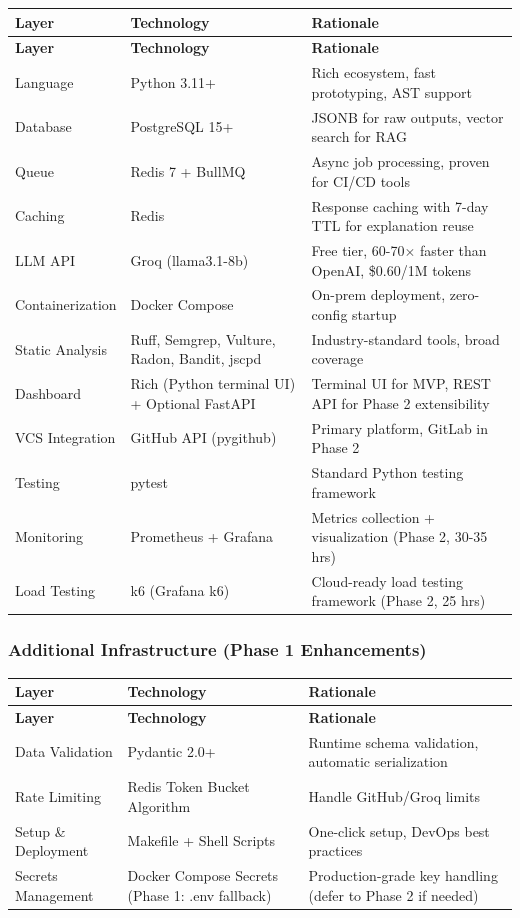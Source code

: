 \documentclass[11pt,a4paper]{article}
\begin{document}
\begin{longtable}{p{3.5cm}p{4cm}p{6cm}}
\toprule
\textbf{Layer} & \textbf{Technology} & \textbf{Rationale} \\
\midrule
\endfirsthead
\toprule
\textbf{Layer} & \textbf{Technology} & \textbf{Rationale} \\
\midrule
\endhead
Language & Python 3.11+ & Rich ecosystem, fast prototyping, AST support \\
\midrule
Database & PostgreSQL 15+ & JSONB for raw outputs, vector search for RAG \\
\midrule
Queue & Redis 7 + BullMQ & Async job processing, proven for CI/CD tools \\
\midrule
Caching & Redis & Response caching with 7-day TTL for explanation reuse \\
\midrule
LLM API & Groq (llama3.1-8b) & Free tier, 60-70$\times$ faster than OpenAI, \$0.60/1M tokens \\
\midrule
Containerization & Docker Compose & On-prem deployment, zero-config startup \\
\midrule
Static Analysis & Ruff, Semgrep, Vulture, Radon, Bandit, jscpd & Industry-standard tools, broad coverage \\
\midrule
Dashboard & Rich (Python terminal UI) + Optional FastAPI & Terminal UI for MVP, REST API for Phase 2 extensibility \\
\midrule
VCS Integration & GitHub API (pygithub) & Primary platform, GitLab in Phase 2 \\
\midrule
Testing & pytest & Standard Python testing framework \\
\midrule
Monitoring & Prometheus + Grafana & Metrics collection + visualization (Phase 2, 30-35 hrs) \\
\midrule
Load Testing & k6 (Grafana k6) & Cloud-ready load testing framework (Phase 2, 25 hrs) \\
\bottomrule
\end{longtable}

\subsubsection{Additional Infrastructure (Phase 1 Enhancements)}

\begin{longtable}{p{3.5cm}p{4cm}p{6cm}}
\toprule
\textbf{Layer} & \textbf{Technology} & \textbf{Rationale} \\
\midrule
\endfirsthead
\toprule
\textbf{Layer} & \textbf{Technology} & \textbf{Rationale} \\
\midrule
\endhead
Data Validation & Pydantic 2.0+ & Runtime schema validation, automatic serialization \\
\midrule
Rate Limiting & Redis Token Bucket Algorithm & Handle GitHub/Groq limits \\
\midrule
Setup \& Deployment & Makefile + Shell Scripts & One-click setup, DevOps best practices \\
\midrule
Secrets Management & Docker Compose Secrets (Phase 1: .env fallback) & Production-grade key handling (defer to Phase 2 if needed) \\
\bottomrule
\end{longtable}
\end{document}
